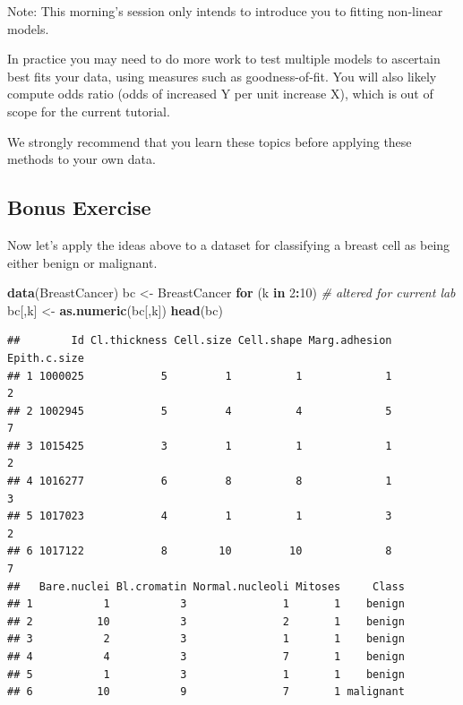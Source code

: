 \documentclass[
]{book}
\newenvironment{Shaded}{\begin{snugshade}}{\end{snugshade}}
\newcommand{\CommentTok}[1]{\textcolor[rgb]{0.56,0.35,0.01}{\textit{#1}}}
\newcommand{\ControlFlowTok}[1]{\textcolor[rgb]{0.13,0.29,0.53}{\textbf{#1}}}
\newcommand{\DecValTok}[1]{\textcolor[rgb]{0.00,0.00,0.81}{#1}}
\newcommand{\FunctionTok}[1]{\textcolor[rgb]{0.13,0.29,0.53}{\textbf{#1}}}
\newcommand{\NormalTok}[1]{#1}
\newcommand{\OtherTok}[1]{\textcolor[rgb]{0.56,0.35,0.01}{#1}}
\newcommand{\SpecialCharTok}[1]{\textcolor[rgb]{0.81,0.36,0.00}{\textbf{#1}}}
\begin{document}
\begin{rmd-caution}
Note: This morning's session only intends to introduce you to fitting
non-linear models.

In practice you may need to do more work to test multiple models to
ascertain best fits your data, using measures such as goodness-of-fit.
You will also likely compute odds ratio (odds of increased Y per unit
increase X), which is out of scope for the current tutorial.

We strongly recommend that you learn these topics before applying these
methods to your own data.
\end{rmd-caution}

\subsection{Bonus Exercise}\label{bonus-exercise-2}

Now let's apply the ideas above to a dataset for classifying a breast cell as being either benign or malignant.

\begin{Shaded}
\begin{Highlighting}[]
\FunctionTok{data}\NormalTok{(BreastCancer)}
\NormalTok{bc }\OtherTok{\textless{}{-}}\NormalTok{ BreastCancer}
\ControlFlowTok{for}\NormalTok{ (k }\ControlFlowTok{in} \DecValTok{2}\SpecialCharTok{:}\DecValTok{10}\NormalTok{) }\CommentTok{\# altered for current lab}
\NormalTok{    bc[,k] }\OtherTok{\textless{}{-}} \FunctionTok{as.numeric}\NormalTok{(bc[,k]) }
\FunctionTok{head}\NormalTok{(bc)}
\end{Highlighting}
\end{Shaded}

\begin{verbatim}
##        Id Cl.thickness Cell.size Cell.shape Marg.adhesion Epith.c.size
## 1 1000025            5         1          1             1            2
## 2 1002945            5         4          4             5            7
## 3 1015425            3         1          1             1            2
## 4 1016277            6         8          8             1            3
## 5 1017023            4         1          1             3            2
## 6 1017122            8        10         10             8            7
##   Bare.nuclei Bl.cromatin Normal.nucleoli Mitoses     Class
## 1           1           3               1       1    benign
## 2          10           3               2       1    benign
## 3           2           3               1       1    benign
## 4           4           3               7       1    benign
## 5           1           3               1       1    benign
## 6          10           9               7       1 malignant
\end{verbatim}
\end{document}
